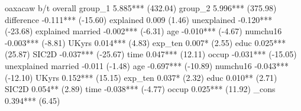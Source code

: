 	oaxacaw
	b/t
overall	
group_1	5.885***
	(432.04)
group_2	5.996***
	(375.98)
difference	-0.111***
	(-15.60)
explained	0.009
	(1.46)
unexplained	-0.120***
	(-23.68)
explained	
married	-0.002***
	(-6.31)
age	-0.010***
	(-4.67)
numchu16	-0.003***
	(-8.81)
UKyrs	0.014***
	(4.83)
exp_ten	0.007*
	(2.55)
educ	0.025***
	(25.87)
SIC2D	-0.037***
	(-25.67)
time	0.047***
	(12.11)
occup	-0.031***
	(-15.05)
unexplained	
married	-0.011
	(-1.48)
age	-0.697***
	(-10.89)
numchu16	-0.043***
	(-12.10)
UKyrs	0.152***
	(15.15)
exp_ten	0.037*
	(2.32)
educ	0.010**
	(2.71)
SIC2D	0.054**
	(2.89)
time	-0.038***
	(-4.77)
occup	0.025***
	(11.92)
_cons	0.394***
	(6.45)
